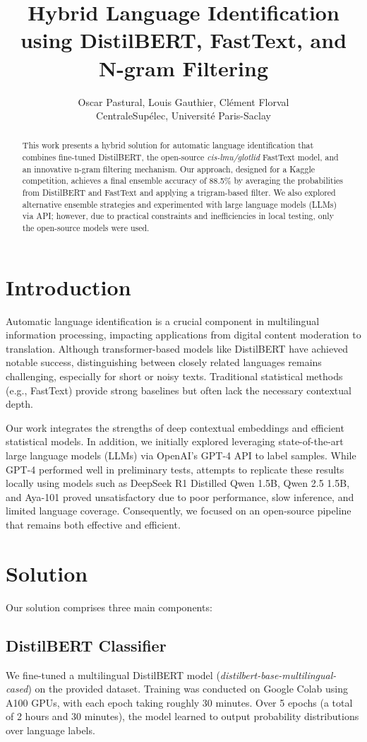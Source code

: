 \documentclass[11pt]{article}
\title{Hybrid Language Identification using DistilBERT, FastText, and N-gram Filtering}
\author{Oscar Pastural, Louis Gauthier, Clément Florval\\
CentraleSupélec, Université Paris-Saclay\\
}
\begin{document}
\maketitle

\begin{abstract}
This work presents a hybrid solution for automatic language identification that combines fine-tuned DistilBERT, the open-source \textit{cis-lmu/glotlid} FastText model, and an innovative n-gram filtering mechanism. Our approach, designed for a Kaggle competition, achieves a final ensemble accuracy of 88.5\% by averaging the probabilities from DistilBERT and FastText and applying a trigram-based filter. We also explored alternative ensemble strategies and experimented with large language models (LLMs) via API; however, due to practical constraints and inefficiencies in local testing, only the open-source models were used.
\end{abstract}

\section{Introduction}
Automatic language identification is a crucial component in multilingual information processing, impacting applications from digital content moderation to translation. Although transformer-based models like DistilBERT have achieved notable success, distinguishing between closely related languages remains challenging, especially for short or noisy texts. Traditional statistical methods (e.g., FastText) provide strong baselines but often lack the necessary contextual depth.

Our work integrates the strengths of deep contextual embeddings and efficient statistical models. In addition, we initially explored leveraging state-of-the-art large language models (LLMs) via OpenAI’s GPT-4 API to label samples. While GPT-4 performed well in preliminary tests, attempts to replicate these results locally using models such as DeepSeek R1 Distilled Qwen 1.5B, Qwen 2.5 1.5B, and Aya-101 proved unsatisfactory due to poor performance, slow inference, and limited language coverage. Consequently, we focused on an open-source pipeline that remains both effective and efficient.

\section{Solution}
Our solution comprises three main components:

\subsection{DistilBERT Classifier}
We fine-tuned a multilingual DistilBERT model (\textit{distilbert-base-multilingual-cased}) on the provided dataset. Training was conducted on Google Colab using A100 GPUs, with each epoch taking roughly 30 minutes. Over 5 epochs (a total of 2 hours and 30 minutes), the model learned to output probability distributions over language labels.
\end{document}

